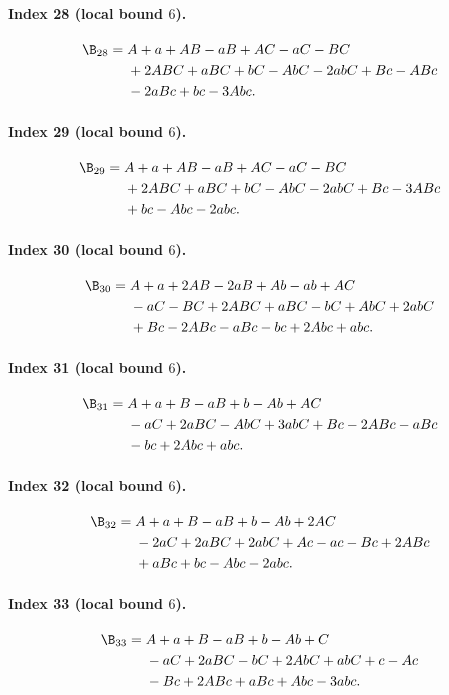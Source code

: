 \paragraph{Index 28 (local bound $6$).}
\begin{align*}
\B_{28}={}&A +a +AB -aB +AC -aC -BC\\
&{}+2ABC +aBC +bC -AbC -2abC +Bc -ABc\\
&{}-2aBc +bc -3Abc.
\end{align*}
\paragraph{Index 29 (local bound $6$).}
\begin{align*}
\B_{29}={}&A +a +AB -aB +AC -aC -BC\\
&{}+2ABC +aBC +bC -AbC -2abC +Bc -3ABc\\
&{}+bc -Abc -2abc.
\end{align*}
\paragraph{Index 30 (local bound $6$).}
\begin{align*}
\B_{30}={}&A +a +2AB -2aB +Ab -ab +AC\\
&{}-aC -BC +2ABC +aBC -bC +AbC +2abC\\
&{}+Bc -2ABc -aBc -bc +2Abc +abc.
\end{align*}
\paragraph{Index 31 (local bound $6$).}
\begin{align*}
\B_{31}={}&A +a +B -aB +b -Ab +AC\\
&{}-aC +2aBC -AbC +3abC +Bc -2ABc -aBc\\
&{}-bc +2Abc +abc.
\end{align*}
\paragraph{Index 32 (local bound $6$).}
\begin{align*}
\B_{32}={}&A +a +B -aB +b -Ab +2AC\\
&{}-2aC +2aBC +2abC +Ac -ac -Bc +2ABc\\
&{}+aBc +bc -Abc -2abc.
\end{align*}
\paragraph{Index 33 (local bound $6$).}
\begin{align*}
\B_{33}={}&A +a +B -aB +b -Ab +C\\
&{}-aC +2aBC -bC +2AbC +abC +c -Ac\\
&{}-Bc +2ABc +aBc +Abc -3abc.
\end{align*}

